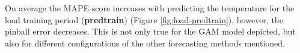 \documentclass[conference]{IEEEtran}
\begin{document}
On average the MAPE score increases with predicting the temperature for the load training period (\textbf{predtrain}) (Figure \ref{fig:load-predtrain}), however, the pinball error decreases. This is not only true for the GAM model depicted, but also for different configurations of the other forecasting methods mentioned.

\end{document}
